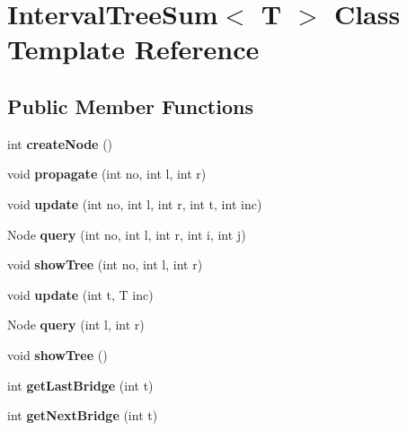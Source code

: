 \hypertarget{classIntervalTreeSum}{}\section{Interval\+Tree\+Sum$<$ T $>$ Class Template Reference}
\label{classIntervalTreeSum}
\subsection*{Public Member Functions}
\begin{DoxyCompactItemize}
\item 
\mbox{\label{classIntervalTreeSum_aed2ddac10bd41fd992ba087e52f80991}} 
int {\bfseries create\+Node} ()
\item 
\mbox{\label{classIntervalTreeSum_a8c0caea5630b5b8aba4144cfe5c123e2}} 
void {\bfseries propagate} (int no, int l, int r)
\item 
\mbox{\label{classIntervalTreeSum_a9fdbedb3b7d8dda648b8dbdefb71b83c}} 
void {\bfseries update} (int no, int l, int r, int t, int inc)
\item 
\mbox{\label{classIntervalTreeSum_a733f73474a86408ae4931248ee8c06b6}} 
Node {\bfseries query} (int no, int l, int r, int i, int j)
\item 
\mbox{\label{classIntervalTreeSum_a5e4d376cdf773bd90a0947dc976a9686}} 
void {\bfseries show\+Tree} (int no, int l, int r)
\item 
\mbox{\label{classIntervalTreeSum_af656a3703ba4a3dec822da1822f60f04}} 
void {\bfseries update} (int t, T inc)
\item 
\mbox{\label{classIntervalTreeSum_a77e39d7cd22fbea638d9479e3507b1d7}} 
Node {\bfseries query} (int l, int r)
\item 
\mbox{\label{classIntervalTreeSum_a50d4a4496d7aac690851effc2ddde293}} 
void {\bfseries show\+Tree} ()
\item 
\mbox{\label{classIntervalTreeSum_ac74a41aea4bcb8a01923e6c55cf0e197}} 
int {\bfseries get\+Last\+Bridge} (int t)
\item 
\mbox{\label{classIntervalTreeSum_a825039975963b5c39e33489a57147769}} 
int {\bfseries get\+Next\+Bridge} (int t)
\end{DoxyCompactItemize}
